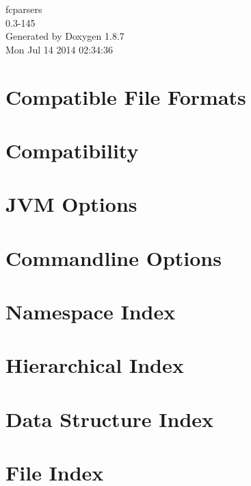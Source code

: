 \documentclass[twoside]{book}
\newcommand{\+}{\discretionary{\mbox{\scriptsize$\hookleftarrow$}}{}{}}
\newcommand{\clearemptydoublepage}{%
  \newpage{\pagestyle{empty}\cleardoublepage}%
}
\begin{document}
\begin{titlepage}
\vspace*{7cm}
\begin{center}%
{\Large fcparsers \\[1ex]\large 0.\+3-\/145 }\\
\vspace*{1cm}
{\large Generated by Doxygen 1.8.7}\\
\vspace*{0.5cm}
{\small Mon Jul 14 2014 02:34:36}\\
\end{center}
\end{titlepage}
\clearemptydoublepage
\tableofcontents
\clearemptydoublepage
{}

\chapter{Compatible File Formats}
\label{formats}

\chapter{Compatibility}
\label{Compatibility}

\chapter{J\+V\+M Options}
\label{jvmopt}

\chapter{Commandline Options}
\label{cmdopt}

\chapter{Namespace Index}

\chapter{Hierarchical Index}

\chapter{Data Structure Index}

\chapter{File Index}

\end{document}
